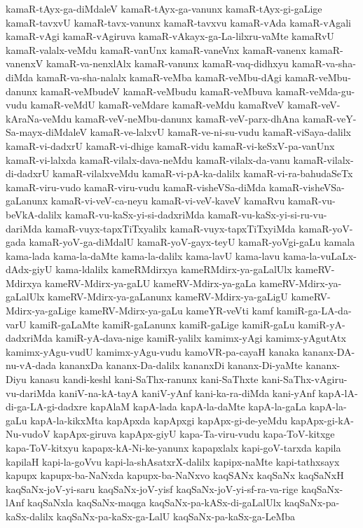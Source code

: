 {kamaR-tAyx-ga-diMdaleV
kamaR-tAyx-ga-vanunx
kamaR-tAyx-gi-gaLige
kamaR-tavxvU
kamaR-tavx-vanunx
kamaR-tavxvu
kamaR-vAda
kamaR-vAgali
kamaR-vAgi
kamaR-vAgiruva
kamaR-vAkayx-ga-La-lilxru-vaMte
kamaRvU
kamaR-valalx-veMdu
kamaR-vanUnx
kamaR-vaneVnx
kamaR-vanenx
kamaR-vanenxV
kamaR-va-nenxlAlx
kamaR-vanunx
kamaR-vaq-didhxyu
kamaR-va-sha-diMda
kamaR-va-sha-nalalx
kamaR-veMba
kamaR-veMbu-dAgi
kamaR-veMbu-danunx
kamaR-veMbudeV
kamaR-veMbudu
kamaR-veMbuva
kamaR-veMda-gu-vudu
kamaR-veMdU
kamaR-veMdare
kamaR-veMdu
kamaRveV
kamaR-veV-kAraNa-veMdu
kamaR-veV-neMbu-danunx
kamaR-veV-parx-dhAna
kamaR-veY-Sa-mayx-diMdaleV
kamaR-ve-lalxvU
kamaR-ve-ni-su-vudu
kamaR-viSaya-dalilx
kamaR-vi-dadxrU
kamaR-vi-dhige
kamaR-vidu
kamaR-vi-keSxV-pa-vanUnx
kamaR-vi-lalxda
kamaR-vilalx-dava-neMdu
kamaR-vilalx-da-vanu
kamaR-vilalx-di-dadxrU
kamaR-vilalxveMdu
kamaR-vi-pA-ka-dalilx
kamaR-vi-ra-bahudaSeTx
kamaR-viru-vudo
kamaR-viru-vudu
kamaR-visheVSa-diMda
kamaR-visheVSa-gaLanunx
kamaR-vi-veV-ca-neyu
kamaR-vi-veV-kaveV
kamaRvu
kamaR-vu-beVkA-dalilx
kamaR-vu-kaSx-yi-si-dadxriMda
kamaR-vu-kaSx-yi-si-ru-vu-dariMda
kamaR-vuyx-tapxTiTxyalilx
kamaR-vuyx-tapxTiTxyiMda
kamaR-yoV-gada
kamaR-yoV-ga-diMdalU
kamaR-yoV-gayx-teyU
kamaR-yoVgi-gaLu
kamala
kama-lada
kama-la-daMte
kama-la-dalilx
kama-lavU
kama-lavu
kama-la-vuLaLx-dAdx-giyU
kama-ldalilx
kameRMdirxya
kameRMdirx-ya-gaLalUlx
kameRV-Mdirxya
kameRV-Mdirx-ya-gaLU
kameRV-Mdirx-ya-gaLa
kameRV-Mdirx-ya-gaLalUlx
kameRV-Mdirx-ya-gaLanunx
kameRV-Mdirx-ya-gaLigU
kameRV-Mdirx-ya-gaLige
kameRV-Mdirx-ya-gaLu
kameYR-veVti
kamf
kamiR-ga-LA-da-varU
kamiR-gaLaMte
kamiR-gaLanunx
kamiR-gaLige
kamiR-gaLu
kamiR-yA-dadxriMda
kamiR-yA-dava-nige
kamiR-yalilx
kamimx-yAgi
kamimx-yAgutAtx
kamimx-yAgu-vudU
kamimx-yAgu-vudu
kamoVR-pa-cayaH
kanaka
kananx-DA-nu-vA-dada
kananxDa
kananx-Da-dalilx
kananxDi
kananx-Di-yaMte
kananx-Diyu
kanasu
kandi-keshl
kani-SaThx-ranunx
kani-SaThxte
kani-SaThx-vAgiru-vu-dariMda
kaniV-na-kA-tayA
kaniV-yAnf
kani-ka-ra-diMda
kani-yAnf
kapA-lA-di-ga-LA-gi-dadxre
kapAlaM
kapA-lada
kapA-la-daMte
kapA-la-gaLa
kapA-la-gaLu
kapA-la-kikxMta
kapApxda
kapApxgi
kapApx-gi-de-yeMdu
kapApx-gi-kA-Nu-vudoV
kapApx-giruva
kapApx-giyU
kapa-Ta-viru-vudu
kapa-ToV-kitxge
kapa-ToV-kitxyu
kapapx-kA-Ni-ke-yanunx
kapapxlalx
kapi-goV-tarxda
kapila
kapilaH
kapi-la-goVvu
kapi-la-shAsatxrX-dalilx
kapipx-naMte
kapi-tathxsayx
kapupx
kapupx-ba-NaNxda
kapupx-ba-NaNxvo
kaqSANx
kaqSaNx
kaqSaNxH
kaqSaNx-joV-yi-saru
kaqSaNx-joV-yisf
kaqSaNx-joV-yi-sf-ra-va-rige
kaqSaNx-lAnf
kaqSaNxla
kaqSaNx-maqga
kaqSaNx-pa-kASx-di-gaLalUlx
kaqSaNx-pa-kaSx-dalilx
kaqSaNx-pa-kaSx-ga-LalU
kaqSaNx-pa-kaSx-ga-LeMba
}
